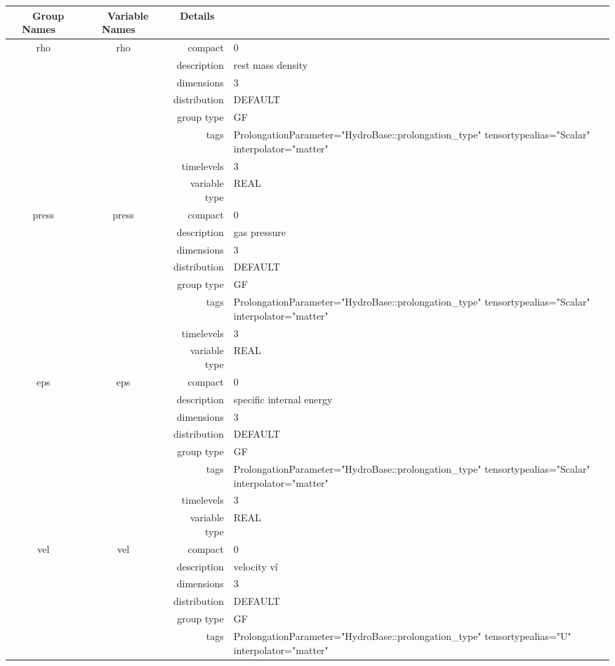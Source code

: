 \begin{tabular*}{150mm}{|c|c@{\extracolsep{\fill}}|rl|} \hline 
~ {\bf Group Names} ~ & ~ {\bf Variable Names} ~  &{\bf Details} ~ & ~\\ 
\hline 
rho & rho & compact & 0 \\ 
 &  & description & rest mass density \\ 
 &  & dimensions & 3 \\ 
 &  & distribution & DEFAULT \\ 
 &  & group type & GF \\ 
 &  & tags & ProlongationParameter="HydroBase::prolongation\_type" tensortypealias="Scalar" interpolator="matter" \\ 
 &  & timelevels & 3 \\ 
 &  & variable type & REAL \\ 
\hline 
press & press & compact & 0 \\ 
 &  & description & gas pressure \\ 
 &  & dimensions & 3 \\ 
 &  & distribution & DEFAULT \\ 
 &  & group type & GF \\ 
 &  & tags & ProlongationParameter="HydroBase::prolongation\_type" tensortypealias="Scalar" interpolator="matter" \\ 
 &  & timelevels & 3 \\ 
 &  & variable type & REAL \\ 
\hline 
eps & eps & compact & 0 \\ 
 &  & description & specific internal energy \\ 
 &  & dimensions & 3 \\ 
 &  & distribution & DEFAULT \\ 
 &  & group type & GF \\ 
 &  & tags & ProlongationParameter="HydroBase::prolongation\_type" tensortypealias="Scalar" interpolator="matter" \\ 
 &  & timelevels & 3 \\ 
 &  & variable type & REAL \\ 
\hline 
vel & vel & compact & 0 \\ 
 &  & description & velocity v\^i \\ 
 &  & dimensions & 3 \\ 
 &  & distribution & DEFAULT \\ 
 &  & group type & GF \\ 
 &  & tags & ProlongationParameter="HydroBase::prolongation\_type" tensortypealias="U" interpolator="matter" \\ 

\end{tabular*}
